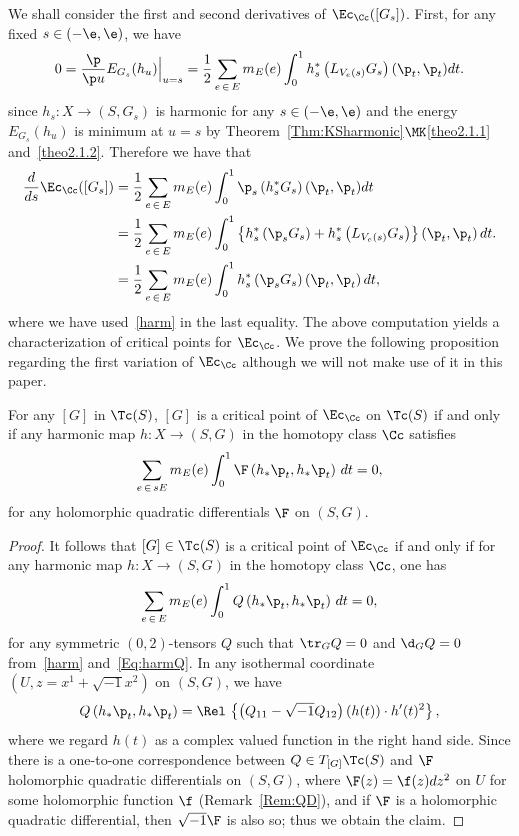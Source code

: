 We shall consider the first and second derivatives of $\Ec_{\Cc}([G_{s}])$. First, for any fixed $s \in (-\e, \e)$, we have
\begin{align}\label{harm}
0=\frac{\p}{\p u} E_{G_{s}}(h_{u})\Big{|}_{u=s}=\frac{1}{2}\sum_{e\,\in\,E}m_E(e)\int_{0}^1h_{s}^*\left(L_{V_e(s)}G_{s}\right)(\p_{t},\p_{t})dt.
\end{align}
since $h_{s}: X\to (S, G_{s})$ is harmonic for any $s \in (-\e, \e)$ and the energy $E_{G_{s}}(h_{u})$ is minimum at $u=s$ by Theorem~\ref{Thm:KSharmonic}$\MK$\eqref{theo2.1.1} and~\eqref{theo2.1.2}. Therefore we have that
\begin{equation}\label{Eq:harmQ}
\begin{aligned}
\frac{d}{d s}\Ec_{\Cc}([G_{s}])&=\frac{1}{2}\sum_{e\,\in\,E}m_E(e)\int_{0}^1{\p_s}\left(h_{s}^*G_{s}\right)(\p_{t},\p_{t})dt\\
&=\frac{1}{2}\sum_{e\,\in\,E}m_E(e)\int_{0}^1\left\{h_{s}^*\left({\p_s}{G}_{s}\right)+h_{s}^*\left(L_{V_e(s)}G_{s}\right)\right\}\left(\p_{t},\p_{t}\right)dt. \\
&=\frac{1}{2}\sum_{e\,\in\,E}m_E(e)\int_{0}^1h_{s}^*\left({\p_s}{G}_{s}\right)\left(\p_{t},\p_{t}\right)dt,
\end{aligned}
\end{equation}
where we have used~\eqref{harm} in the last equality. The above computation yields a characterization of critical points for $\Ec_\Cc$. We prove the following proposition regarding the first variation of $\Ec_\Cc$ although we will not make use of it in this paper.


\begin{prop}
For any $[G]$ in $\Tc(S)$, $[G]$ is a critical point of $\Ec_\Cc$ on $\Tc(S)$ if and only if any harmonic map $h:X \to (S, G)$ in the homotopy class $\Cc$ satisfies
\[
\sum_{e\,\in\,sE}m_E(e)\int_0^1 \F\left(h_{\ast}\p_t, h_{\ast}\p_t\right)\,dt=0,
\]
for any holomorphic quadratic differentials $\F$ on $(S, G)$.
\end{prop}

\begin{proof}
It follows that $[G] \in \Tc(S)$ is a critical point of $\Ec_\Cc$ if and only if for any harmonic map $h:X \to (S, G)$ in the homotopy class $\Cc$, one has
\[
\sum_{e\,\in\,E}m_E(e)\int_0^1 Q\left(h_{ \ast}\p_t, h_{\ast}\p_t\right)\,dt=0,
\]
for any symmetric $(0, 2)$-tensors $Q$ such that $\tr_{G}Q=0$ and $\d_{G}Q=0$ from~\eqref{harm} and~\eqref{Eq:harmQ}. In any isothermal coordinate $(U, z=x^1+\sqrt{-1}x^2)$ on $(S, G)$, we have
\[
Q\left(h_{\ast}\p_t, h_{\ast}\p_t\right)=\Rel\,\left\{\left(Q_{11}-\sqrt{-1}Q_{12}\right)(h(t))\cdot h'(t)^2\right\},
\]
where we regard $h(t)$ as a complex valued function in the right hand side. Since there is a one-to-one correspondence between $Q \in T_{[G]}\Tc(S)$ and $\F$ holomorphic quadratic differentials on $(S, G)$, where $\F(z)=\f(z)dz^2$ on $U$ for some holomorphic function $\f$ (Remark~\ref{Rem:QD}), and if $\F$ is a holomorphic quadratic differential, then $\sqrt{-1}\F$ is also so; thus we obtain the claim.
\end{proof}



